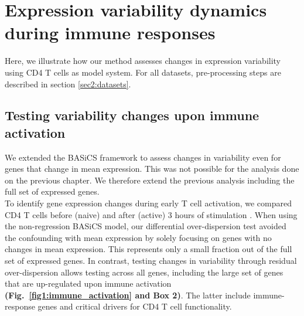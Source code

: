 \section{Expression variability dynamics during immune responses}

Here, we illustrate how our method assesses changes in expression variability using CD4\plus{} T cells as model system. For all datasets, pre-processing steps are described in section \ref{sec2:datasets}. 

\subsection{Testing variability changes upon immune activation}

We extended the BASiCS framework to assess changes in variability even for genes that change in mean expression. This was not possible for the analysis done on the previous chapter. We therefore extend the previous analysis including the full set of expressed genes. \\

To identify gene expression changes during early T cell activation, we compared CD4\plus{} T cells before (naive) and after (active) 3 hours of stimulation \citep{Martinez-jimenez2017}. When using the non-regression BASiCS model, our differential over-dispersion test avoided the confounding with mean expression by solely focusing on genes with no changes in mean expression. This represents only a small fraction 
out of the full set of expressed genes. In contrast, testing changes in variability through residual over-dispersion allows testing across all genes, including the large set of genes that are up-regulated upon immune activation \textbf{(Fig.~\ref{fig1:immune_activation} and Box 2)}. The latter include immune-response genes and critical drivers for CD4\plus{} T cell functionality.\\

